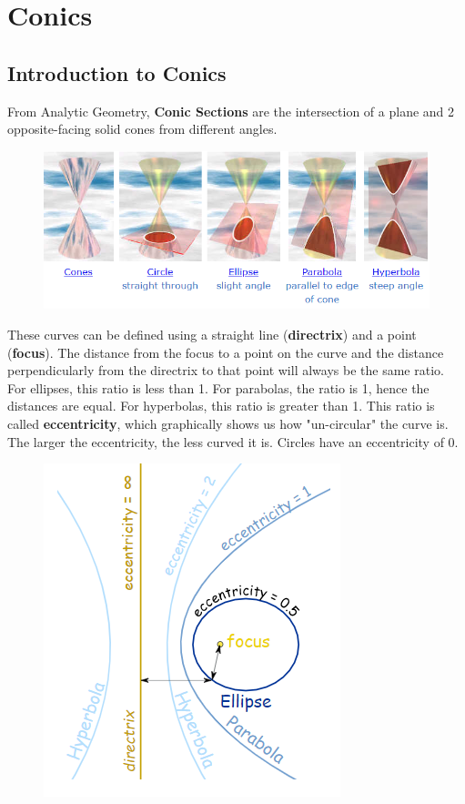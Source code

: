 \section{Conics}

    \subsection{Introduction to Conics}
        From Analytic Geometry, \textbf{Conic Sections} are the intersection of a plane and
        2 opposite-facing solid cones from different angles. \\

        \begin{figure} [hbt!]
            \centering
            \includegraphics [scale=0.6] {Resources/Unit10Conics/conics.PNG}
        \end{figure}

        \noindent These curves can be defined using a straight line (\textbf{directrix}) and a
        point (\textbf{focus}). The distance from the focus to a point on the curve and the
        distance perpendicularly from the directrix to that point will always be the same ratio.
        For ellipses, this ratio is less than 1. For parabolas, the ratio is 1, hence the
        distances are equal. For hyperbolas, this ratio is greater than 1. This ratio is called
        \textbf{eccentricity}, which graphically shows us how "un-circular" the curve is. The
        larger the eccentricity, the less curved it is. Circles have an eccentricity of 0. \\

        \begin{figure} [hbt!]
            \centering
            \includegraphics [scale=0.5] {Resources/Unit10Conics/ecc.PNG}
        \end{figure}

